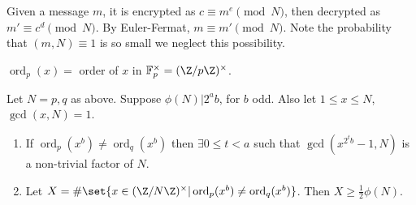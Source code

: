 \documentclass{article}
\newcommand{\F}{\mathbb{F}}
\newcommand{\1}[1]{\mathbbm{1}_{#1}}
\DeclareMathOperator{\ord}{ord}
\begin{document}
Given a message $m$, it is encrypted as $c \equiv m^e \pmod{N}$, then decrypted as $m' \equiv c^d \pmod{N}$.
By Euler-Fermat, $m \equiv m' \pmod{N}$.
Note the probability that $(m, N) \equiv 1$ is so small we neglect this possibility.
\begin{notation}
    $\ord_p(x)=$ order of $x$ in $\F_p^\times = (\Z/p\Z)^\times$.
\end{notation}
\begin{nthm}\label{thm:3.7}
    Let $N = p,q$ as above. Suppose $\phi(N) | 2^a b$, for $b$ odd. Also let $1 \leq x \leq N$, $\gcd(x, N) = 1$.
    \begin{enumerate}[label=(\roman*)]
        \item If $\ord_p(x^b) \neq \ord_q(x^b)$ then $\exists 0 \leq t < a$ such that $\gcd(x^{2^t b}-1, N)$ is a non-trivial factor of $N$.
        \item Let $X = \#\set{x \in (\Z/N\Z)^\times | \ord_p(x^b) \neq \ord_q(x^b)}$. Then $X \geq \frac{1}{2} \phi(N)$.
    \end{enumerate}
\end{nthm}
\end{document}
